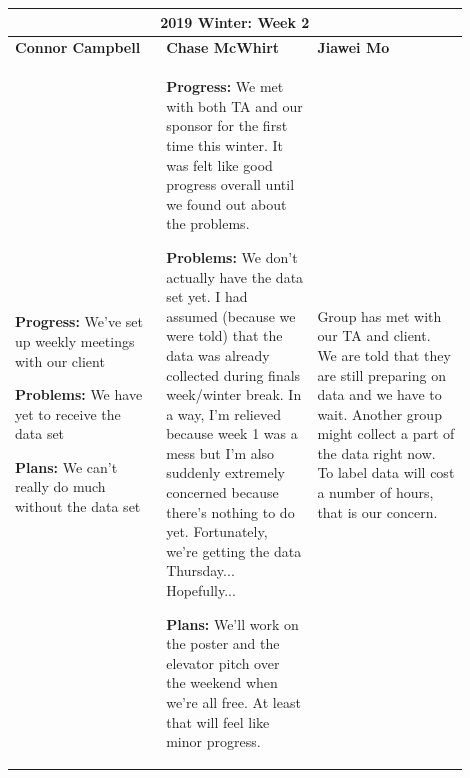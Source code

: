 \documentclass[10pt,journal,compsoc, draftclsnofoot,onecolumn]{IEEEtran}
\begin{document}
\begin{center}
\begin{tabular}{|p{0.3\linewidth}|p{0.3\linewidth}|p{0.3\linewidth}|}
\hline
\multicolumn{3}{|c|}{\textbf{2019 Winter: Week 2}} \\
\hline
\textbf{Connor Campbell} & \textbf{Chase McWhirt} & \textbf{Jiawei Mo} \\ [0.5ex]
\hline\hline

\textbf{Progress:} We've set up weekly meetings with our client

\textbf{Problems:} We have yet to receive the data set

\textbf{Plans:} We can't really do much without the data set
&
\textbf{Progress:} We met with both TA and our sponsor for the first time this winter.
It was felt like good progress overall until we found out about the problems.

\textbf{Problems:} We don't actually have the data set yet.
I had assumed (because we were told) that the data was already collected during finals week/winter break.
In a way, I'm relieved because week 1 was a mess but I'm also suddenly extremely concerned because there's nothing to do yet.
Fortunately, we're getting the data Thursday... Hopefully...

\textbf{Plans:} We'll work on the poster and the elevator pitch over the weekend when we're all free.
At least that will feel like minor progress.
&
Group has met with our TA and client. We are told that they are still preparing on data and we have to wait. Another group might collect a part of the data right now. To label data will cost a number of hours, that is our concern.
\\ \hline
\end{tabular}
\end{center}
\end{document}
